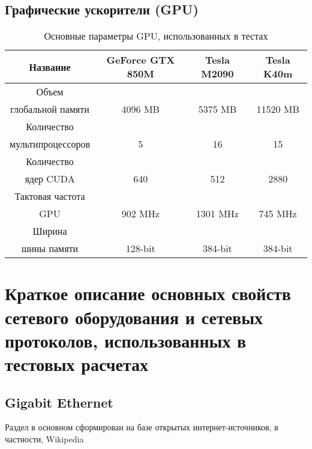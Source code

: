 \clearpage
\section{Графические ускорители (GPU)}

\begin{table}[ht]
	\begin{center}
		\caption{Основные параметры GPU, использованных в тестах}
		\begin{tabular}{|c|c|c|c|}
			\hline
			Название                &  GeForce GTX 850M & Tesla M2090 & Tesla K40m \\ \hline
			Объем                  &                   &             &             \\
			глобальной памяти       & 4096 MB           & 5375 MB     & 11520 MB \\ \hline
			Количество              &             &               &     \\
			мультипроцессоров       & 5           &  16           & 15  \\ \hline
			Количество              &             &               &     \\
			ядер CUDA               & 640         & 512         & 2880  \\ \hline
			Тактовая частота        &             &             &         \\
			GPU                     & 902 MHz     & 1301 MHz    & 745 MHz \\ \hline
			Ширина                  &             &             &         \\
			шины памяти             & 128-bit     & 384-bit     & 384-bit \\ \hline
		\end{tabular}
		\label{GPUs}
	\end{center}
\end{table}



\chapter{Краткое описание основных свойств сетевого оборудования и сетевых протоколов, использованных в тестовых расчетах} \label{AppendixB}

\section{Gigabit Ethernet}
Раздел в основном сформирован на базе открытых интернет-источников, в частности, Wikipedia 

